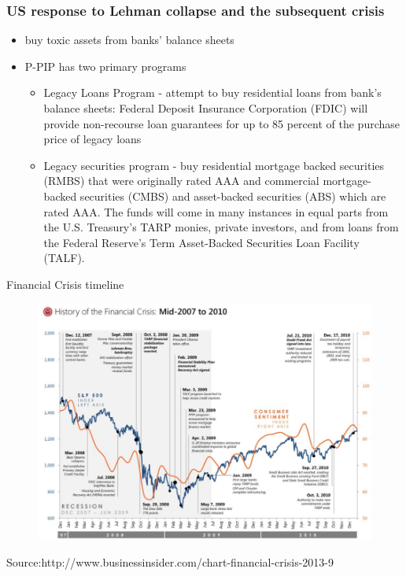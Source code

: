 \documentclass[11pt]{beamer}
\begin{document}
\begin{frame}
\hfill \break
\frametitle{US response to Lehman collapse and the subsequent crisis}
\begin{itemize}
\item buy toxic assets from banks' balance sheets
\item P-PIP has two primary programs
\begin{itemize}
\item Legacy Loans Program - attempt to buy residential loans from bank's balance sheets: Federal Deposit Insurance Corporation (FDIC) will provide non-recourse loan guarantees for up to 85 percent of the purchase price of legacy loans
\item Legacy securities program -  buy residential mortgage backed securities (RMBS) that were originally rated AAA and commercial mortgage-backed securities (CMBS) and asset-backed securities (ABS) which are rated AAA. The funds will come in many instances in equal parts from the U.S. Treasury's TARP monies, private investors, and from loans from the Federal Reserve's Term Asset-Backed Securities Loan Facility (TALF).
\end{itemize}
\end{itemize}
\end{frame}



\begin{frame}
Financial Crisis timeline
\begin{figure}
\includegraphics[width=1\textwidth]{GFC1.png}
\end{figure}
\tiny{Source:http://www.businessinsider.com/chart-financial-crisis-2013-9}
\end{frame}
\end{document}
